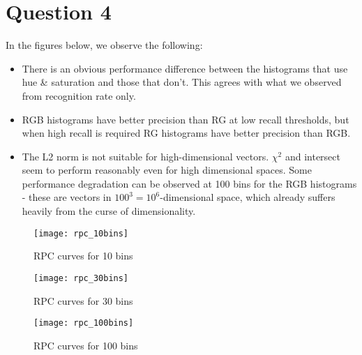 \documentclass{article}
\begin{document}
\newpage
\section*{Question 4}

In the figures below, we observe the following:
\begin{itemize}
    \item There is an obvious performance difference between the histograms that use hue \& saturation and those that don't. This agrees with what we observed from recognition rate only.

    \item RGB histograms have better precision than RG at low recall thresholds, but when high recall is required RG histograms have better precision than RGB.
    
    \item The L2 norm is not suitable for high-dimensional vectors. $\chi^2$ and intersect seem to perform reasonably even for high dimensional spaces. Some performance degradation can be observed at 100 bins for the RGB histograms - these are vectors in $100^3 = 10^6$-dimensional space, which already suffers heavily from the curse of dimensionality.
\end{itemize}

\begin{figure}[h]
\centering
\texttt{[image: rpc\_10bins]}
\caption{RPC curves for 10 bins}
\end{figure}

\begin{figure}[h]
\centering
\texttt{[image: rpc\_30bins]}
\caption{RPC curves for 30 bins}
\end{figure}

\begin{figure}[h]
\centering
\texttt{[image: rpc\_100bins]}
\caption{RPC curves for 100 bins}
\end{figure}
\end{document}
